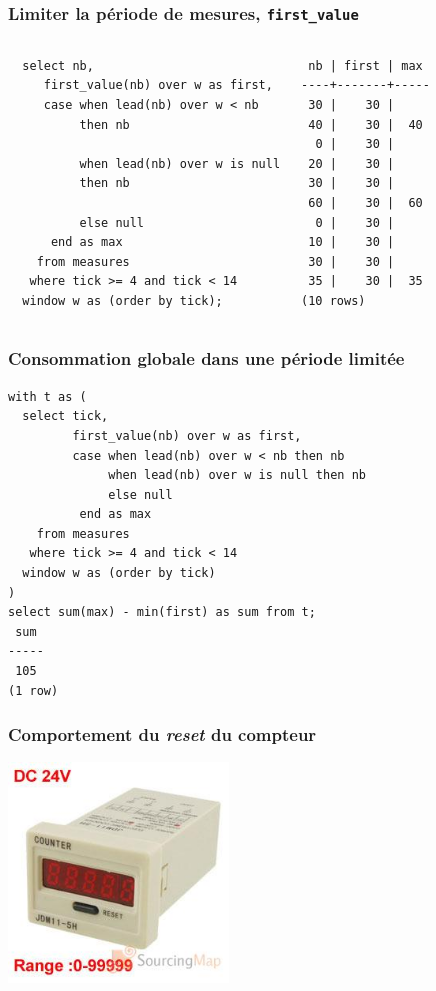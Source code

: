 \documentclass{beamer}
\begin{document}
\begin{frame}[fragile]
  \frametitle{Limiter la période de mesures, \texttt{first\_value}}

\begin{columns}
\begin{verbatim}
  select nb,
     first_value(nb) over w as first,
     case when lead(nb) over w < nb
          then nb

          when lead(nb) over w is null
          then nb

          else null
      end as max
    from measures
   where tick >= 4 and tick < 14
  window w as (order by tick);
\end{verbatim}

\begin{verbatim}
 nb | first | max 
----+-------+-----
 30 |    30 |    
 40 |    30 |  40
  0 |    30 |    
 20 |    30 |    
 30 |    30 |    
 60 |    30 |  60
  0 |    30 |    
 10 |    30 |    
 30 |    30 |    
 35 |    30 |  35
(10 rows)
\end{verbatim}
\end{columns}
\end{frame}

\begin{frame}[fragile]
  \frametitle{Consommation globale dans une période limitée}

\begin{verbatim}
with t as (
  select tick,
         first_value(nb) over w as first,
         case when lead(nb) over w < nb then nb
              when lead(nb) over w is null then nb
              else null
          end as max
    from measures
   where tick >= 4 and tick < 14
  window w as (order by tick)
)
select sum(max) - min(first) as sum from t;
 sum 
-----
 105
(1 row)
\end{verbatim}
\end{frame}

\begin{frame}[fragile]
  \frametitle{Comportement du \textit{reset} du compteur}

  \begin{center}
    \includegraphics[height=2.3in]{reset-elect.jpg}
  \end{center}
  
\end{frame}
\end{document}

